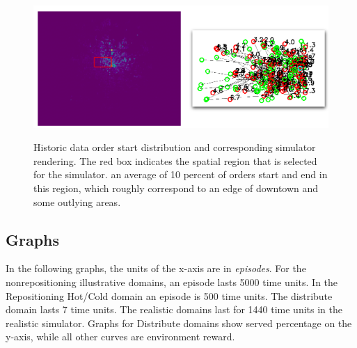 \begin{figure}[H]
\begin{floatrow}
\centering
\includegraphics[width=.75\linewidth]{sections/mddqn/figures/historic_simulator.png}\label{fig:historic}
\caption{Historic data order start distribution and corresponding simulator rendering. The red box indicates the spatial region that is selected for the simulator. an average of 10 percent of orders start and end in this region, which roughly correspond to an edge of downtown and some outlying areas.}
\end{floatrow}
\end{figure}


\subsection{Graphs}
In the following graphs, the units of the x-axis are in {\em episodes}. For the nonrepositioning illustrative domains, an episode lasts 5000 time units. In the Repositioning Hot/Cold domain an episode is 500 time units. The distribute domain lasts 7 time units. The realistic domains last for 1440 time units in the realistic simulator. Graphs for Distribute domains show served percentage on the y-axis, while all other curves are environment reward.





